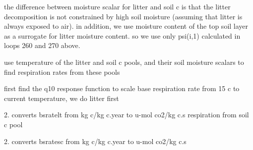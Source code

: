 the difference between moisture scalar for litter and soil c is that the litter decomposition is not constrained by high soil moisture (assuming that litter is always exposed to air). in addition, we use moisture content of the top soil layer as a surrogate for litter moisture content. so we use only psi(i,1) calculated in loops 260 and 270 above.

use temperature of the litter and soil c pools, and their soil moisture scalars to find respiration rates from these pools

first find the q10 response function to scale base respiration rate from 15 c to current temperature, we do litter first

2. converts bsratelt from kg c/kg c.\+year to u-\/mol co2/kg c.\+s respiration from soil c pool

2. converts bsratesc from kg c/kg c.\+year to u-\/mol co2/kg c.\+s 
